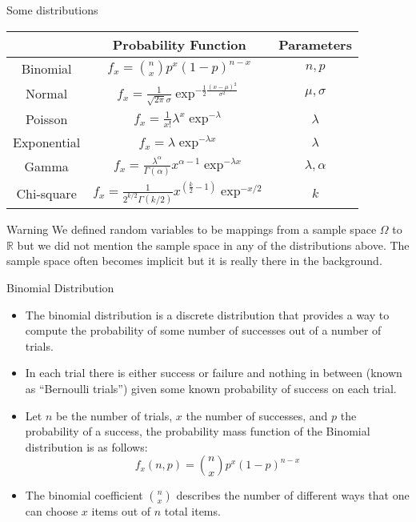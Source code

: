 \documentclass[handout]{beamer}
\begin{document}
\begin{frame}{Some distributions}
\scriptsize{ 

\begin{table}
\centering
\begin{tabular}{c|c|c}
\hline
  & Probability Function & Parameters   \\ 
\hline
Binomial & $f_x= {n \choose x}p^{x}(1-p)^{n-x} $ & $n,p$ \\ \hline
Normal & $f_x=\frac{1}{\sqrt{2\pi}\sigma}\exp^{-\frac{1}{2}\frac{(x-\mu)^2}{\sigma^{2}}}$ & $\mu, \sigma$ \\ \hline
Poisson & $f_x=\frac{1}{x!}\lambda^{x}\exp^{-\lambda}$ & $\lambda$ \\ \hline
Exponential & $f_x= \lambda \exp^{-\lambda x}$  & $\lambda$ \\ \hline
Gamma & $f_x= \frac{\lambda^{\alpha}}{\Gamma(\alpha)} x^{\alpha -1}\exp^{-\lambda x} $ & $\lambda , \alpha$ \\ \hline
Chi-square & $f_x=\frac{1}{2^{k/2} \Gamma(k/2)} x^{(\frac{k}{2} -1)} \exp^{-x/2} $  & $k$  \\
\hline
\end{tabular}
\end{table}

\begin{block}{Warning}
We defined random variables to be mappings from a sample space $\Omega$ to $\mathbb{R}$ but we did not mention the sample space in any of the distributions above. The sample space often becomes implicit but it is really there in the background. 
\end{block}



}
\end{frame}



\begin{frame}[fragile]{Binomial Distribution}

\scriptsize{
\begin{itemize}
 \item  The binomial distribution is a discrete distribution that provides a way to compute the probability of some number of successes out of a number of trials.
 \item In each trial there is either success or failure and nothing in between (known as “Bernoulli trials”) given some known probability of success on each trial.
 \item Let $n$ be the number of trials, $x$ the number of successes, and $p$ the probability of a success, the probability mass function of the Binomial distribution is as follows:
 \begin{displaymath}
  f_x(n,p)= {n \choose x}p^{x}(1-p)^{n-x} 
 \end{displaymath}
\item The binomial coefficient ${n \choose x}$ describes the number of different ways that one can choose $x$ items out of $n$ total items.

 \end{itemize}}
 
 \end{frame}
 
\end{document}

